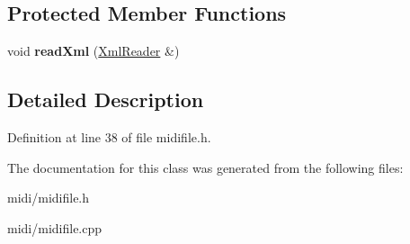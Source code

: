 \subsection*{Protected Member Functions}
\begin{DoxyCompactItemize}
\item 
\mbox{\label{class_ms_1_1_midi_track_a27bb430e424378bfd16f42e2561443c6}} 
void {\bfseries read\+Xml} (\hyperlink{class_ms_1_1_xml_reader}{Xml\+Reader} \&)
\end{DoxyCompactItemize}


\subsection{Detailed Description}


Definition at line 38 of file midifile.\+h.



The documentation for this class was generated from the following files\+:\begin{DoxyCompactItemize}
\item 
midi/midifile.\+h\item 
midi/midifile.\+cpp\end{DoxyCompactItemize}
